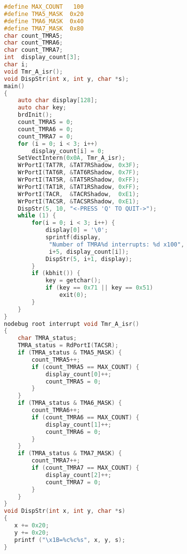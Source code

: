 \begin{lstlisting}[language=C]
#define MAX_COUNT   100
#define TMA5_MASK  0x20
#define TMA6_MASK  0x40
#define TMA7_MASK  0x80
char count_TMRA5;
char count_TMRA6;
char count_TMRA7;
int  display_count[3];
char i;
void Tmr_A_isr();
void DispStr(int x, int y, char *s);
main()
{
    auto char display[128];
    auto char key;
    brdInit();
    count_TMRA5 = 0;
    count_TMRA6 = 0;
    count_TMRA7 = 0;
    for (i = 0; i < 3; i++)
        display_count[i] = 0;
    SetVectIntern(0x0A, Tmr_A_isr);
    WrPortI(TAT7R, &TAT7RShadow, 0x3F);
    WrPortI(TAT6R, &TAT6RShadow, 0x7F);
    WrPortI(TAT5R, &TAT5RShadow, 0xFF);
    WrPortI(TAT1R, &TAT1RShadow, 0xFF);
    WrPortI(TACR,  &TACRShadow,  0xE1);
    WrPortI(TACSR, &TACSRShadow, 0xE1);
    DispStr(5, 10, "<-PRESS 'Q' TO QUIT->");
    while (1) {
        for(i = 0; i < 3; i++) {
            display[0] = '\0';
            sprintf(display, 
             "Number of TMRA%d interrupts: %d x100",
             i+5, display_count[i]);
            DispStr(5, i+1, display);
        }
        if (kbhit()) {
            key = getchar();
            if (key == 0x71 || key == 0x51)
                exit(0);
        }
    }
}
nodebug root interrupt void Tmr_A_isr()
{
    char TMRA_status;
    TMRA_status = RdPortI(TACSR);
    if (TMRA_status & TMA5_MASK) {
        count_TMRA5++;
        if (count_TMRA5 == MAX_COUNT) {
            display_count[0]++;
            count_TMRA5 = 0;
        }
    }
    if (TMRA_status & TMA6_MASK) {
        count_TMRA6++;
        if (count_TMRA6 == MAX_COUNT) {
            display_count[1]++;
            count_TMRA6 = 0;
        }
    }
    if (TMRA_status & TMA7_MASK) {
        count_TMRA7++;
        if (count_TMRA7 == MAX_COUNT) {
            display_count[2]++;
            count_TMRA7 = 0;
        }
    }
}
void DispStr(int x, int y, char *s)
{
   x += 0x20;
   y += 0x20;
   printf ("\x1B=%c%c%s", x, y, s);
}
\end{lstlisting}